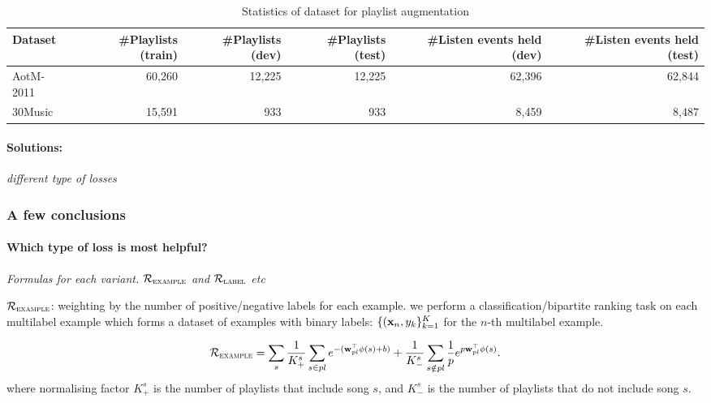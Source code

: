 \begin{table}[!h]
\centering
\caption{Statistics of dataset for playlist augmentation}
\label{tab:stats_pla}
\small
\begin{tabular}{l|rrrrr}
\toprule
Dataset   & \#Playlists (train) & \#Playlists (dev) & \#Playlists (test)  & \#Listen events held (dev) & \#Listen events held (test) \\
\midrule
AotM-2011 & 60,260              & 12,225            & 12,225              & 62,396                     & 62,844 \\
30Music   & 15,591              & 933               & 933                 & 8,459                      & 8,487  \\
\bottomrule
\end{tabular}
\end{table}

\paragraph{Solutions:}
{\it different type of losses}


\subsubsection{A few conclusions}

\paragraph{Which type of loss is most helpful?}

\TODO
{\it Formulas for each variant. $\mathcal{R}_\textsc{example}$ and $\mathcal{R}_\textsc{label}$ etc}

$\mathcal{R}_\textsc{example}$: weighting by the number of positive/negative labels for each example.
\ie we perform a classification/bipartite ranking task on each multilabel example 
which forms a dataset of examples with binary labels: $\{(\mathbf{x}_n, y_k\}_{k=1}^K$ for the $n$-th multilabel example.

\begin{equation*}
\mathcal{R}_\textsc{example} 
= \displaystyle \sum_s 
  \frac{1}{K_+^s} \sum_{s \in pl} e^{-(\mathbf{w}_{pl}^\top \phi(s) + b)} +
  \frac{1}{K_-^s} \sum_{s \notin pl} \frac{1}{p} e^{p \mathbf{w}_{pl}^\top \phi(s)}.
\end{equation*}
where normalising factor $K_+^s$ is the number of playlists that include song $s$,
and $K_-^s$ is the number of playlists that do not include song $s$.


